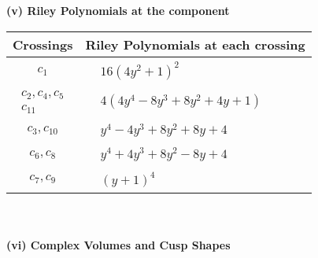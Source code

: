 \documentclass[1p]{elsarticle_modified}
\theoremstyle{definition}
\begin{document}
\newpage\renewcommand{\arraystretch}{1}
\flushleft \textbf{(v) Riley Polynomials at the component}\newline \\
\begin{tabular}{m{50pt}|m{274pt}}
Crossings & \hspace{64pt}Riley Polynomials at each crossing \\
\hline $$\begin{aligned}c_{1}\end{aligned}$$&$\begin{aligned}
&16(4 y^2+1)^2
\end{aligned}$\\
\hline $$\begin{aligned}c_{2},c_{4},c_{5}\\c_{11}\end{aligned}$$&$\begin{aligned}
&4(4 y^4-8 y^3+8 y^2+4 y+1)
\end{aligned}$\\
\hline $$\begin{aligned}c_{3},c_{10}\end{aligned}$$&$\begin{aligned}
&y^4-4 y^3+8 y^2+8 y+4
\end{aligned}$\\
\hline $$\begin{aligned}c_{6},c_{8}\end{aligned}$$&$\begin{aligned}
&y^4+4 y^3+8 y^2-8 y+4
\end{aligned}$\\
\hline $$\begin{aligned}c_{7},c_{9}\end{aligned}$$&$\begin{aligned}
&(y+1)^4
\end{aligned}$\\
\hline
\end{tabular}\\~\\
\newpage\flushleft \textbf{(vi) Complex Volumes and Cusp Shapes}
\end{document}
